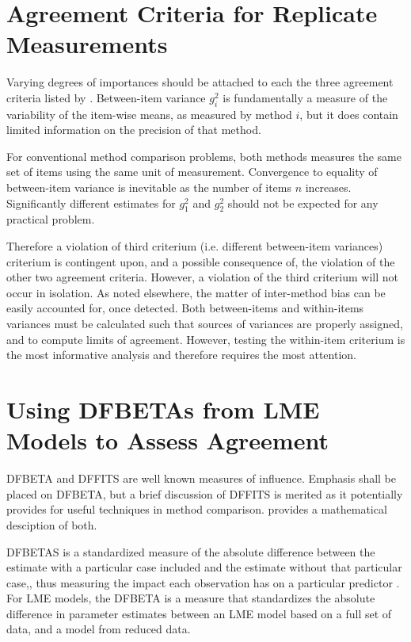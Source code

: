 \documentclass[12pt, a4paper]{report}
\theoremstyle{definition}
\theoremstyle{remark}
\begin{document}
\section{Agreement Criteria for Replicate Measurements}


Varying degrees of importances should be attached to each the three agreement criteria listed by \citet{Barnhart}. Between-item variance $g^2_i$ is fundamentally a measure of the variability of the item-wise means, as measured by method $i$, but it does contain limited information on the precision of that method. 

For conventional method comparison problems, both methods measures the same set of items using the same unit of measurement. Convergence to equality of between-item variance is inevitable as the number of items $n$ increases. Significantly different estimates for $g^2_1$ and $g^2_2$ should not be expected for any practical problem. 

Therefore a violation of third criterium (i.e. different between-item variances) criterium is contingent upon, and a  
possible consequence of, the violation of the other two agreement criteria. However, a violation of the third criterium will not occur in isolation. As noted elsewhere, the matter of inter-method bias can be easily accounted for, once detected. Both between-items and within-items variances must be calculated such that sources of variances are properly assigned, and to compute limits of agreement. However, testing the within-item criterium is the most informative analysis and therefore requires the most attention. 







\section{Using DFBETAs from LME Models to Assess Agreement}

 DFBETA and DFFITS are well known measures of influence. Emphasis shall be placed on DFBETA, but a brief discussion of DFFITS is merited as it potentially provides for useful techniques in method comparison. \citet{schabenberger} provides a mathematical desciption of both.


DFBETAS is a standardized measure of the absolute difference between the estimate with a particular
case included and the estimate without that particular case,, thus measuring the impact each observation has on a particular predictor \citep{belsley2005}. For LME models, the DFBETA is a measure that standardizes the absolute difference in parameter estimates between an LME model based on a full set of data, and a model from reduced data.
\end{document}
